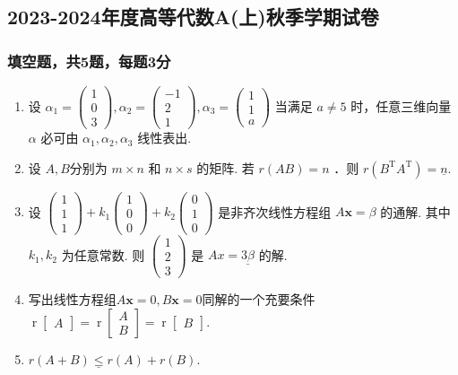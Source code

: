\subsection{2023-2024年度高等代数A(上)秋季学期试卷}

\subsubsection*{填空题，共5题，每题3分}

\begin{enumerate}
    \item 设 $\alpha_1=\left(\begin{array}{l}1 \\ 0 \\ 3\end{array}\right) , \alpha_2=\left(\begin{array}{c}-1 \\ 2 \\ 1\end{array}\right) , \alpha_3=\left(\begin{array}{l}1 \\ 1 \\ a\end{array}\right)$ 当满足 \underline{$a \neq 5$} 时，任意三维向量 $\alpha$ 必可由 $\alpha_1, \alpha_2, \alpha_3$ 线性表出.
    \item 设 $A,B$分别为 $m \times n$ 和 $n \times s$ 的矩阵. 若 $r(A B)=n$ ．则 $r\left(B^{\text{T}} A^{\text{T}}\right)=\underline{n}$.
    \item 设 $\left(\begin{array}{l}1 \\ 1 \\ 1\end{array}\right)+k_1\left(\begin{array}{l}1 \\ 0 \\ 0\end{array}\right)+k_2\left(\begin{array}{l}0 \\ 1 \\ 0\end{array}\right)$ 是非齐次线性方程组 $A \mathbf{x}=\beta$ 的通解. 其中$k_1,k_2$ 为任意常数. 则 $\left(\begin{array}{l}1 \\ 2 \\ 3\end{array}\right)$ 是 $A x=\underline{3 \beta}$ 的解.
    \item 写出线性方程组$A\mathbf{x}=0,B\mathbf{x}=0$同解的一个充要条件\underline{$\operatorname{r}\begin{bmatrix}
        A
    \end{bmatrix}=\operatorname{r}\begin{bmatrix}
        A\\B
    \end{bmatrix}=\operatorname{r}\begin{bmatrix}
        B
    \end{bmatrix}.$}
    \item $r(A+B) \underline{\leq} r(A)+r(B)$.
\end{enumerate}

